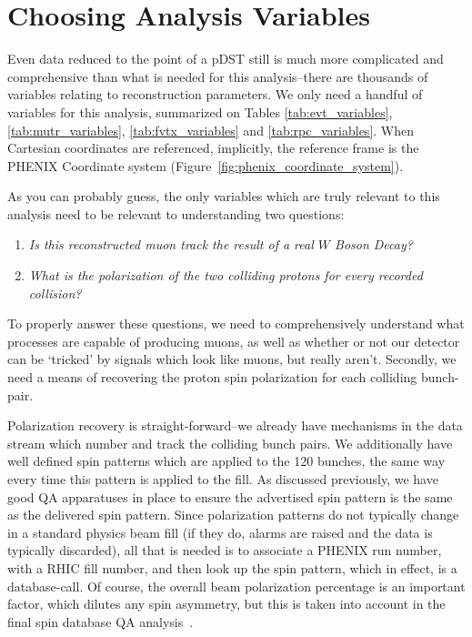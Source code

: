 \section{Choosing Analysis Variables}

Even data reduced to the point of a pDST still is much more complicated and
comprehensive than what is needed for this analysis--there are thousands of
variables relating to reconstruction parameters. We only need a handful of
variables for this analysis, summarized on Tables
\ref{tab:evt_variables},\ref{tab:mutr_variables}, \ref{tab:fvtx_variables} and
\ref{tab:rpc_variables}. When Cartesian coordinates are referenced, implicitly,
the reference frame is the PHENIX Coordinate system
(Figure~\ref{fig:phenix_coordinate_system}).

As you can probably guess, the only variables which are truly relevant to this
analysis need to be relevant to understanding two questions:

\begin{enumerate}
  \item \textit{Is this reconstructed muon track the result of a real $W$ Boson Decay?}
  \item \textit{What is the polarization of the two colliding protons for every recorded collision?}
\end{enumerate}

To properly answer these questions, we need to comprehensively understand what
processes are capable of producing muons, as well as whether or not our detector
can be `tricked' by signals which look like muons, but really aren't. Secondly,
we need a means of recovering the proton spin polarization for each colliding
bunch-pair.

Polarization recovery is straight-forward--we already have mechanisms in the
data stream which number and track the colliding bunch pairs. We additionally
have well defined spin patterns which are applied to the 120 bunches, the same
way every time this pattern is applied to the fill. As discussed previously, we
have good QA apparatuses in place to ensure the advertised spin pattern is the
same as the delivered spin pattern. Since polarization patterns do not typically
change in a standard physics beam fill (if they do, alarms are raised and the
data is typically discarded), all that is needed is to associate a PHENIX run
number, with a RHIC fill number, and then look up the spin pattern, which in
effect, is a database-call. Of course, the overall beam polarization percentage
is an important factor, which dilutes any spin asymmetry, but this is taken into
account in the final spin database QA analysis~\cite{Kim2014}.

